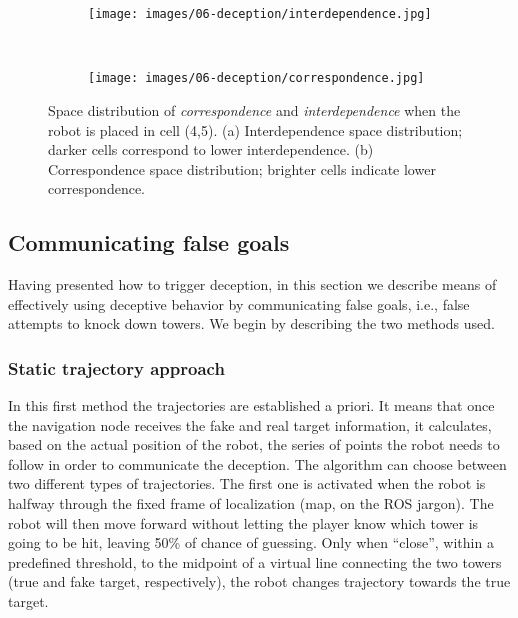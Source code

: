 \begin{figure}[H]
    \centering
    \begin{subfigure}[t]{0.49\columnwidth}
        \centering
        \texttt{[image: images/06-deception/interdependence.jpg]}
        \caption{}
        \label{fig:interdipendence}
    \end{subfigure}
    ~
    \begin{subfigure}[t]{0.49\columnwidth}
        \centering
        \texttt{[image: images/06-deception/correspondence.jpg]}
        \caption{}
        \label{fig:correspondence}
    \end{subfigure}
    \caption{Space distribution of \textit{correspondence} and \textit{interdependence} when the robot is placed in cell (4,5). (a) Interdependence space distribution; darker cells correspond to lower interdependence. (b) Correspondence space distribution; brighter cells indicate lower correspondence.}
    \label{fig::interdependece}
\end{figure}

\subsection{Communicating false goals}\label{sec:deception_communicate}
Having presented how to trigger deception, in this section we describe means of effectively using deceptive behavior by communicating false goals, i.e., false attempts to knock down towers. We begin by describing the two methods used.
\subsubsection{Static trajectory approach}
In this first method the trajectories are established a priori. It means that once the navigation node receives the fake and real target information, it calculates, based on the actual position of the robot, the series of points the robot needs to follow in order to communicate the deception.
The algorithm can choose between two different types of trajectories. The first one is activated when the robot is halfway through the fixed frame of localization (map, on the ROS jargon). The robot will then move forward without letting the player know which tower is going to be hit, leaving 50\% of chance of guessing. Only when ``close'', within a predefined threshold, to the midpoint of a virtual line connecting the two towers (true and fake target, respectively), the robot changes trajectory towards the true target.

